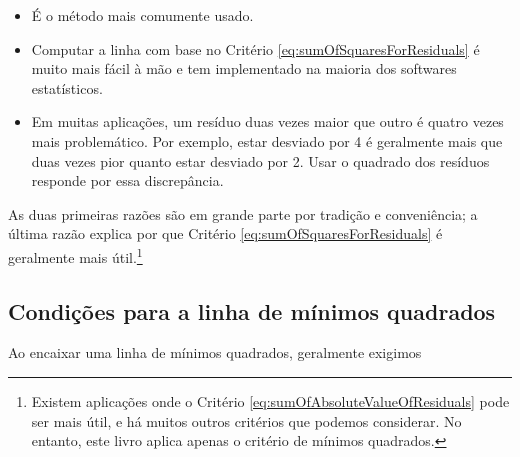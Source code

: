 \documentclass[
]{book}
\theoremstyle{definition}
\theoremstyle{definition}
\theoremstyle{definition}
\theoremstyle{definition}
\theoremstyle{remark}
\begin{document}
\begin{itemize}
\item
  É o método mais comumente usado.
\item
  Computar a linha com base no Critério \eqref{eq:sumOfSquaresForResiduals} é muito mais fácil à mão e tem implementado na maioria dos softwares estatísticos.
\item
  Em muitas aplicações, um resíduo duas vezes maior que outro é quatro vezes mais problemático. Por exemplo, estar desviado por 4 é geralmente mais que duas vezes pior quanto estar desviado por 2. Usar o quadrado dos resíduos responde por essa discrepância.
\end{itemize}

As duas primeiras razões são em grande parte por tradição e conveniência; a última razão explica por que Critério \eqref{eq:sumOfSquaresForResiduals} é geralmente mais útil.\footnote{Existem aplicações onde o Critério \eqref{eq:sumOfAbsoluteValueOfResiduals} pode ser mais útil, e há muitos outros critérios que podemos considerar. No entanto, este livro aplica apenas o critério de mínimos quadrados.}

\hypertarget{conditionsLeastSquareLine}{%
\subsection{Condições para a linha de mínimos quadrados}\label{conditionsLeastSquareLine}}

Ao encaixar uma linha de mínimos quadrados, geralmente exigimos
\end{document}
